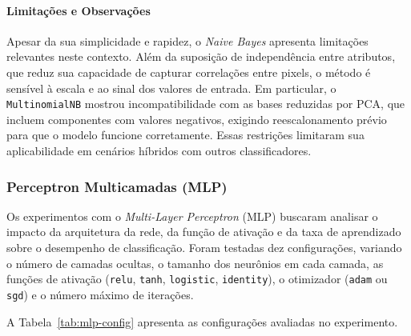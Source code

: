 \documentclass[12pt]{article}
\begin{document}
\paragraph{Limitações e Observações}

Apesar da sua simplicidade e rapidez, o \textit{Naive Bayes} apresenta limitações relevantes neste contexto.  
Além da suposição de independência entre atributos, que reduz sua capacidade de capturar correlações entre pixels, o método é sensível à escala e ao sinal dos valores de entrada.  
Em particular, o \texttt{MultinomialNB} mostrou incompatibilidade com as bases reduzidas por PCA, que incluem componentes com valores negativos, exigindo reescalonamento prévio para que o modelo funcione corretamente.  
Essas restrições limitaram sua aplicabilidade em cenários híbridos com outros classificadores.


\subsubsection{Perceptron Multicamadas (MLP)}

Os experimentos com o \textit{Multi-Layer Perceptron} (MLP) buscaram analisar o impacto da arquitetura da rede, da função de ativação e da taxa de aprendizado sobre o desempenho de classificação. Foram testadas dez configurações, variando o número de camadas ocultas, o tamanho dos neurônios em cada camada, as funções de ativação (\texttt{relu}, \texttt{tanh}, \texttt{logistic}, \texttt{identity}), o otimizador (\texttt{adam} ou \texttt{sgd}) e o número máximo de iterações.

A Tabela~\ref{tab:mlp-config} apresenta as configurações avaliadas no experimento.
\end{document}
